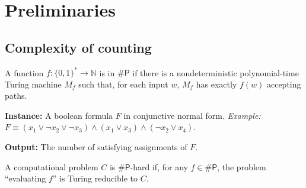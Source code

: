 \section{Preliminaries}

\subsection{Complexity of counting}

\begin{frame}
  \begin{definition}
    A function $f \colon \{0,1\}^{*} \to \mathbb{N}$ is in $\# \mathsf{P}$ if there is a
    nondeterministic polynomial-time Turing machine $M_f$ such that, for each input $w$, $M_f$
    has exactly $f(w)$ accepting paths.
  \end{definition}
  \begin{example}[$\#SAT$]
    \textbf{Instance:} A boolean formula $F$ in conjunctive normal form. \textit{Example:}
    $F \equiv (x_1 \lor \neg x_2 \lor \neg x_3) \wedge (x_1 \lor x_3) \wedge (\neg x_2 \lor x_4)$.

    \textbf{Output:} The number of satisfying assignments of $F$. \\
  \end{example}

  
  \begin{definition}[$\# P$-hardness]
    A computational problem $C$ is $\# \mathsf{P}$-hard if, for any $f \in \# \mathsf{P}$, the problem ``evaluating $f$'' is Turing reducible to $C$.
    
  \end{definition}
\end{frame}

